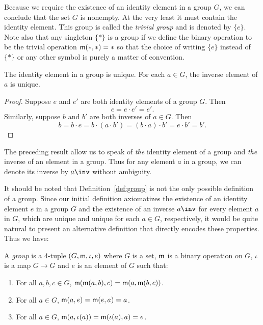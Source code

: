 Because we require the existence of an identity element in a group \(G\), we can
conclude that the set \(G\) is nonempty. At the very least it must contain the
identity element. This group is called the \emph{trivial group} and is denoted
by \(\{e\}\). Note also that any singleton \(\{*\}\) is a group if we define the
binary operation to be the trivial operation \({\mathsf{m}}(*, *) = *\) so that the
choice of writing \(\{e\}\) instead of \(\{*\}\) or any other symbol is purely a
matter of convention.

\begin{theorem}
    The identity element in a group is unique. For each \(a \in G\), the inverse
    element of \(a\) is unique.
\end{theorem}

\begin{proof}
    Suppose \(e\) and \(e'\) are both identity elements of a group \(G\). Then
    \[
        e = e \cdot e' = e'.
    \]
    Similarly, suppose \(b\) and \(b'\) are both inverses of \(a \in G\). Then
    \[
        b = b \cdot e = b \cdot (a \cdot b') = (b \cdot a) \cdot b' = e \cdot b' = b'.
    \]
\end{proof}

The preceding result allow us to speak of \emph{the} identity element of a group
and \emph{the} inverse of an element in a group. Thus for any element \(a\) in a
group, we can denote its inverse by \(a\inv\) without ambiguity.

It should be noted that Definition~\ref{def:group} is not the only possible
definition of a group. Since our initial definition axiomatizes the existence of
an identity element \(e\) in a group \(G\) and the existence of an inverse
\(a\inv\) for every element \(a\) in \(G\), which are unique and unique for each
\(a\in G\), respectively, it would be quite natural to present an alternative definition that directly encodes these properties. Thus we have:
\begin{definition}
    \label{def:group-4-tuple}
    A \emph{group} is a 4-tuple \((G, {\mathsf{m}}, \iota, e)\) where \(G\) is a set,
    \({\mathsf{m}}\) is a binary operation on \(G\), \(\iota\) is a map \(G \to G\) and
    \(e\) is an element of \(G\) such that:
    \begin{enumerate}[label=(\alph*), itemsep=0pt]
        \item For all \(a, b, c \in G\), \({\mathsf{m}}({\mathsf{m}}(a, b), c) = {\mathsf{m}}(a,
        {\mathsf{m}}(b, c))\).
        \item For all \(a \in G\), \({\mathsf{m}}(a, e) = {\mathsf{m}}(e, a) = a\).
        \item For all \(a \in G\), \({\mathsf{m}}(a, \iota(a)) = {\mathsf{m}}(\iota(a), a) =
        e\).
    \end{enumerate}
\end{definition}

